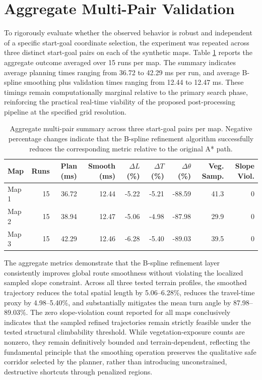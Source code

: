 \section{Aggregate Multi-Pair Validation}
To rigorously evaluate whether the observed behavior is robust and independent of a specific
start-goal coordinate selection, the experiment was repeated across three distinct start-goal pairs
on each of the synthetic maps. Table \ref{tab:multi_pair_summary} reports the aggregate outcome
averaged over 15 runs per map. The summary indicates average planning times ranging from 36.72 to
42.29 ms per run, and average B-spline smoothing plus validation times ranging from 12.44 to 12.47
ms. These timings remain computationally marginal relative to the primary search phase, reinforcing
the practical real-time viability of the proposed post-processing pipeline at the specified grid
resolution.

\begin{table}[htbp]
\centering
\caption{Aggregate multi-pair summary across three start-goal pairs per map. Negative percentage changes indicate that the B-spline refinement algorithm successfully reduces the corresponding metric relative to the original A* path.}
\label{tab:multi_pair_summary}
\small
\begin{tabular}{lrrrrrrrr}
\toprule
Map & Runs & Plan (ms) & Smooth (ms) & $\Delta L$ (\%) & $\Delta T$ (\%) & $\Delta \theta$ (\%) & Veg. Samp. & Slope Viol. \\ 
\midrule
Map 1 & 15 & 36.72 & 12.44 & -5.22 & -5.21 & -88.59 & 41.3 & 0 \\ 
Map 2 & 15 & 38.94 & 12.47 & -5.06 & -4.98 & -87.98 & 29.9 & 0 \\ 
Map 3 & 15 & 42.29 & 12.46 & -6.28 & -5.40 & -89.03 & 39.5 & 0 \\ 
\bottomrule
\end{tabular}
\end{table}

The aggregate metrics demonstrate that the B-spline refinement layer consistently improves global
route smoothness without violating the localized sampled slope constraint. Across all three tested
terrain profiles, the smoothed trajectory reduces the total spatial length by 5.06--6.28\%, reduces
the travel-time proxy by 4.98--5.40\%, and substantially mitigates the mean turn angle by
87.98--89.03\%. The zero slope-violation count reported for all maps conclusively indicates that the
sampled refined trajectories remain strictly feasible under the tested structural climbability
threshold. While vegetation-exposure counts are nonzero, they remain definitively bounded and
terrain-dependent, reflecting the fundamental principle that the smoothing operation preserves the
qualitative safe corridor selected by the planner, rather than introducing unconstrained,
destructive shortcuts through penalized regions.

